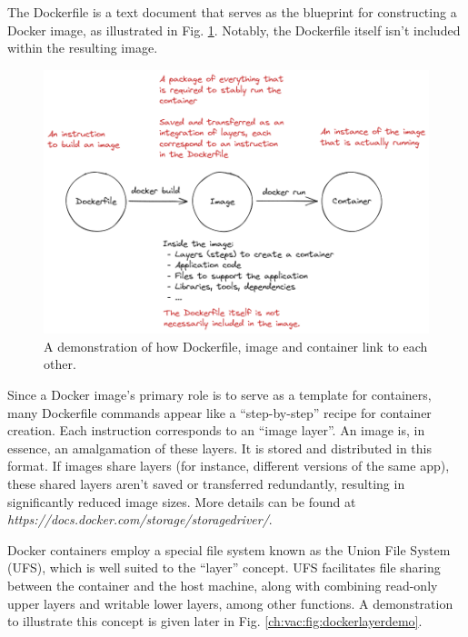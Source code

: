 The Dockerfile is a text document that serves as the blueprint for constructing a Docker image, as illustrated in Fig. \ref{ch:vac:fig:dockerfiletoimage}. Notably, the Dockerfile itself isn't included within the resulting image.

\begin{figure}
	\centering
	\includegraphics[width=350pt]{chapters/ch-virtualization-and-containerization/figures/dockerfiletoimage.png}
	\caption{A demonstration of how Dockerfile, image and container link to each other.} \label{ch:vac:fig:dockerfiletoimage}
\end{figure}

Since a Docker image's primary role is to serve as a template for containers, many Dockerfile commands appear like a ``step-by-step'' recipe for container creation. Each instruction corresponds to an ``image layer''. An image is, in essence, an amalgamation of these layers. It is stored and distributed in this format. If images share layers (for instance, different versions of the same app), these shared layers aren't saved or transferred redundantly, resulting in significantly reduced image sizes. More details can be found at \textit{https://docs.docker.com/storage/storagedriver/}.

Docker containers employ a special file system known as the Union File System (UFS), which is well suited to the ``layer'' concept. UFS facilitates file sharing between the container and the host machine, along with combining read-only upper layers and writable lower layers, among other functions. A demonstration to illustrate this concept is given later in Fig. \ref{ch:vac:fig:dockerlayerdemo}.

